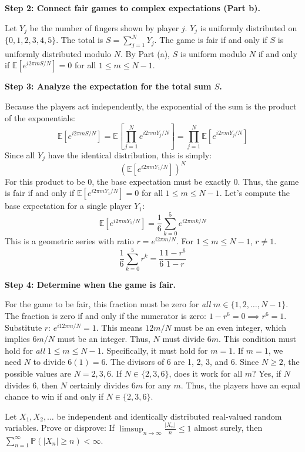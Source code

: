 \begin{solution}
\textbf{Step 2: Connect fair games to complex expectations (Part b).}

Let $Y_j$ be the number of fingers shown by player $j$. $Y_j$ is uniformly distributed on $\{0, 1, 2, 3, 4, 5\}$.
The total is $S = \sum_{j=1}^N Y_j$.
The game is fair if and only if $S$ is uniformly distributed modulo $N$.
By Part (a), $S$ is uniform modulo $N$ if and only if $\mathbb{E}[e^{i 2\pi m S / N}] = 0$ for all $1 \leq m \leq N-1$.

\textbf{Step 3: Analyze the expectation for the total sum $S$.}

Because the players act independently, the exponential of the sum is the product of the exponentials:
\[ \mathbb{E}[e^{i 2\pi m S / N}] = \mathbb{E}\left[ \prod_{j=1}^N e^{i 2\pi m Y_j / N} \right] = \prod_{j=1}^N \mathbb{E}[e^{i 2\pi m Y_j / N}] \]
Since all $Y_j$ have the identical distribution, this is simply:
\[ \left( \mathbb{E}[e^{i 2\pi m Y_1 / N}] \right)^N \]
For this product to be 0, the base expectation must be exactly 0. Thus, the game is fair if and only if $\mathbb{E}[e^{i 2\pi m Y_1 / N}] = 0$ for all $1 \leq m \leq N-1$.
Let's compute the base expectation for a single player $Y_1$:
\[ \mathbb{E}[e^{i 2\pi m Y_1 / N}] = \frac{1}{6} \sum_{k=0}^5 e^{i 2\pi m k / N} \]
This is a geometric series with ratio $r = e^{i 2\pi m / N}$. For $1 \leq m \leq N-1$, $r \neq 1$.
\[ \frac{1}{6} \sum_{k=0}^5 r^k = \frac{1}{6} \frac{1 - r^6}{1 - r} \]

\textbf{Step 4: Determine when the game is fair.}

For the game to be fair, this fraction must be zero for \textit{all} $m \in \{1, 2, \dots, N-1\}$.
The fraction is zero if and only if the numerator is zero: $1 - r^6 = 0 \implies r^6 = 1$.
Substitute $r$: $e^{i 12\pi m / N} = 1$.
This means $12m/N$ must be an even integer, which implies $6m/N$ must be an integer. Thus, $N$ must divide $6m$.
This condition must hold for \textit{all} $1 \leq m \leq N-1$.
Specifically, it must hold for $m=1$. If $m=1$, we need $N$ to divide $6(1) = 6$.
The divisors of 6 are 1, 2, 3, and 6. Since $N \geq 2$, the possible values are $N = 2, 3, 6$.
If $N \in \{2, 3, 6\}$, does it work for all $m$? Yes, if $N$ divides 6, then $N$ certainly divides $6m$ for any $m$.
Thus, the players have an equal chance to win if and only if $N \in \{2, 3, 6\}$.
\end{solution}

\begin{exercise}\label{probability:2016:9}
Let $X_1, X_2, \dots$ be independent and identically distributed real-valued random variables. Prove or disprove: If $\limsup_{n \to \infty} \frac{|X_n|}{n} \leq 1$ almost surely, then $\sum_{n=1}^\infty \mathbb{P}(|X_n| \geq n) < \infty$.
\end{exercise}

